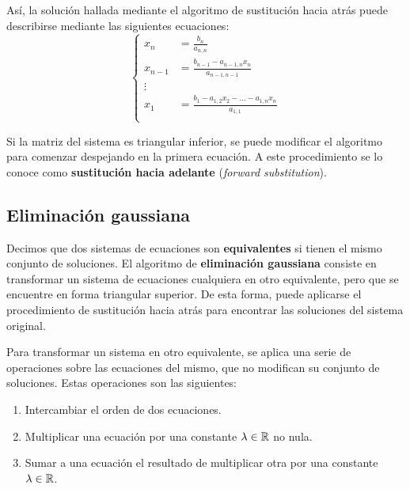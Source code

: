 Así, la solución hallada mediante el algoritmo de sustitución hacia atrás
puede describirse mediante las siguientes ecuaciones:
\[ \left\lbrace \begin{aligned}
    x_{n} &= \frac{b_{n}}{a_{n,n}} \\
    x_{n-1} &= \frac{b_{n-1} - a_{n-1,n}x_{n}}{a_{n-1,n-1}} \\
    \vdots \\
    x_{1} &= \frac{b_{1} - a_{1,2}x_{2} - \dots - a_{1,n}x_{n}}{a_{1,1}} \\
\end{aligned} \right. \]

Si la matriz del sistema es triangular inferior, se puede modificar el
algoritmo para comenzar despejando en la primera ecuación. A este
procedimiento se lo conoce como \textbf{sustitución hacia adelante}
(\emph{forward substitution}).

\subsection{Eliminación gaussiana}

Decimos que dos sistemas de ecuaciones son \textbf{equivalentes} si tienen el
mismo conjunto de soluciones. El algoritmo de \textbf{eliminación gaussiana}
consiste en transformar un sistema de ecuaciones cualquiera en otro
equivalente, pero que se encuentre en forma triangular superior. De esta forma,
puede aplicarse el procedimiento de sustitución hacia atrás para encontrar
las soluciones del sistema original.

Para transformar un sistema en otro equivalente, se aplica una serie de
operaciones sobre las ecuaciones del mismo, que no modifican su conjunto
de soluciones. Estas operaciones son las siguientes:
\begin{enumerate}[label=(\arabic*),itemsep=0em]
\item Intercambiar el orden de dos ecuaciones.
\item Multiplicar una ecuación por una constante $\lambda \in \mathbb{R}$ no nula.
\item Sumar a una ecuación el resultado de multiplicar otra por una constante
$\lambda \in \mathbb{R}$.
\end{enumerate}

